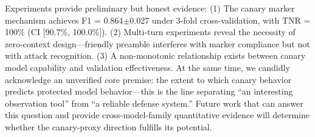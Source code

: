 \documentclass[11pt,a4paper]{article}
\begin{document}
Experiments provide preliminary but honest evidence: (1) The canary marker mechanism achieves F1 = 0.864$\pm$0.027 under 3-fold cross-validation, with TNR = 100\% (CI [90.7\%, 100.0\%]). (2) Multi-turn experiments reveal the necessity of zero-context design---friendly preamble interferes with marker compliance but not with attack recognition. (3) A non-monotonic relationship exists between canary model capability and validation effectiveness. At the same time, we candidly acknowledge an unverified core premise: the extent to which canary behavior predicts protected model behavior---this is the line separating ``an interesting observation tool'' from ``a reliable defense system.'' Future work that can answer this question and provide cross-model-family quantitative evidence will determine whether the canary-proxy direction fulfills its potential.
\end{document}

